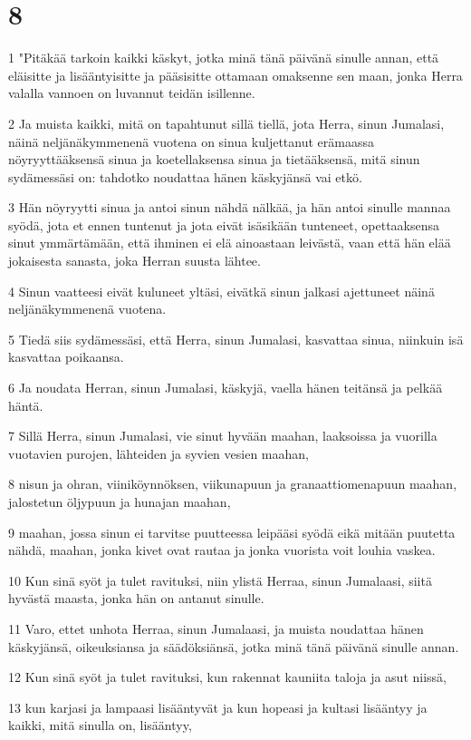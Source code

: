 \chapter{8}

\par 1 "Pitäkää tarkoin kaikki käskyt, jotka minä tänä päivänä sinulle annan, että eläisitte ja lisääntyisitte ja pääsisitte ottamaan omaksenne sen maan, jonka Herra valalla vannoen on luvannut teidän isillenne.
\par 2 Ja muista kaikki, mitä on tapahtunut sillä tiellä, jota Herra, sinun Jumalasi, näinä neljänäkymmenenä vuotena on sinua kuljettanut erämaassa nöyryyttääksensä sinua ja koetellaksensa sinua ja tietääksensä, mitä sinun sydämessäsi on: tahdotko noudattaa hänen käskyjänsä vai etkö.
\par 3 Hän nöyryytti sinua ja antoi sinun nähdä nälkää, ja hän antoi sinulle mannaa syödä, jota et ennen tuntenut ja jota eivät isäsikään tunteneet, opettaaksensa sinut ymmärtämään, että ihminen ei elä ainoastaan leivästä, vaan että hän elää jokaisesta sanasta, joka Herran suusta lähtee.
\par 4 Sinun vaatteesi eivät kuluneet yltäsi, eivätkä sinun jalkasi ajettuneet näinä neljänäkymmenenä vuotena.
\par 5 Tiedä siis sydämessäsi, että Herra, sinun Jumalasi, kasvattaa sinua, niinkuin isä kasvattaa poikaansa.
\par 6 Ja noudata Herran, sinun Jumalasi, käskyjä, vaella hänen teitänsä ja pelkää häntä.
\par 7 Sillä Herra, sinun Jumalasi, vie sinut hyvään maahan, laaksoissa ja vuorilla vuotavien purojen, lähteiden ja syvien vesien maahan,
\par 8 nisun ja ohran, viiniköynnöksen, viikunapuun ja granaattiomenapuun maahan, jalostetun öljypuun ja hunajan maahan,
\par 9 maahan, jossa sinun ei tarvitse puutteessa leipääsi syödä eikä mitään puutetta nähdä, maahan, jonka kivet ovat rautaa ja jonka vuorista voit louhia vaskea.
\par 10 Kun sinä syöt ja tulet ravituksi, niin ylistä Herraa, sinun Jumalaasi, siitä hyvästä maasta, jonka hän on antanut sinulle.
\par 11 Varo, ettet unhota Herraa, sinun Jumalaasi, ja muista noudattaa hänen käskyjänsä, oikeuksiansa ja säädöksiänsä, jotka minä tänä päivänä sinulle annan.
\par 12 Kun sinä syöt ja tulet ravituksi, kun rakennat kauniita taloja ja asut niissä,
\par 13 kun karjasi ja lampaasi lisääntyvät ja kun hopeasi ja kultasi lisääntyy ja kaikki, mitä sinulla on, lisääntyy,

